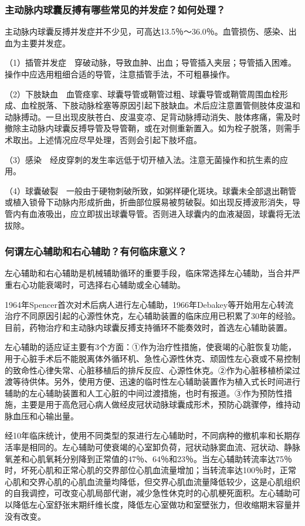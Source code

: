 \subsubsection{主动脉内球囊反搏有哪些常见的并发症？如何处理？}

主动脉内球囊反搏并发症并不少见，可高达13.5％～36.0％。血管损伤、感染、出血为主要并发症。

（1）插管并发症　穿破动脉，导致血肿、出血；导管插入夹层；导管插入困难。操作中应选用粗细合适的导管，注意插管手法，不可粗暴操作。

（2）下肢缺血　血管痉挛、球囊导管或鞘管过粗、球囊导管或鞘管周围血栓形成、血栓脱落、下肢动脉栓塞等原因引起下肢缺血。术后应注意置管侧肢体皮温和动脉搏动。一旦出现皮肤苍白、皮温变凉、足背动脉搏动消失、肢体疼痛，需及时撤除主动脉内球囊反搏导管及导管鞘，或在对侧重新置入。如为栓子脱落，则需手术取出。上述情况应尽早处理，否则会引起下肢坏疽。

（3）感染　经皮穿刺的发生率远低于切开植入法。注意无菌操作和抗生素的应用。

（4）球囊破裂　一般由于硬物刺破所致，如粥样硬化斑块。球囊未全部退出鞘管或植入锁骨下动脉内形成折曲，折曲部位膜易被剪破裂。如出现反搏波形消失，导管内有血液吸出，应立即拔出球囊导管。否则进入球囊内的血液凝固，球囊将无法拔除。

\subsubsection{何谓左心辅助和右心辅助？有何临床意义？}

左心辅助和右心辅助是机械辅助循环的重要手段，临床常选择左心辅助，当合并严重右心功能衰竭时，可选择右心辅助或全心辅助。

1964年Spencer首次对术后病人进行左心辅助，1966年Debakey等开始用左心转流治疗不同原因引起的心源性休克，左心辅助装置的临床应用已积累了30年的经验。目前，药物治疗和主动脉内球囊反搏支持循环不能奏效时，首选左心辅助装置。

左心辅助的适应证主要有3个方面：①作为治疗性措施，使衰竭的心脏恢复功能，用于心脏手术后不能脱离体外循环机、急性心源性休克、顽固性左心衰或不易控制的致命性心律失常、心脏移植后的排斥反应、心源性休克。②作为心脏移植桥梁过渡等待供体。另外，使用方便、迅速的临时性左心辅助装置作为植入式长时间进行辅助的左心辅助装置和人工心脏的中间过渡措施，也时有报道。③作为预防性措施，主要是用于高危冠心病人做经皮冠状动脉球囊成形术，预防心跳骤停，维持动脉血压和心输出量。

经10年临床统计，使用不同类型的泵进行左心辅助时，不同病种的撤机率和长期存活率是相同的。左心辅助可使衰竭的心室卸负荷，冠状动脉窦血流、冠状动、静脉氧差和心肌氧耗分别降到正常值的47％、64％和23％。当左心辅助转流率达75％时，坏死心肌和正常心肌的交界部位心肌血流量增加；当转流率达100％时，正常心肌和交界心肌的心肌血流量均降低，但交界心肌血流量降低较少，这是心肌组织的自我调控，可改变心肌局部代谢，减少急性休克时的心肌梗死面积。左心辅助可以降低左心室舒张末期纤维长度，降低左心室做功和室壁张力，但收缩期末容量并没有改变。

